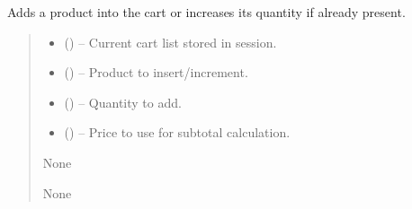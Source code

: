 \documentclass[a4paper,11pt,spanish]{sphinxmanual}
\begin{document}
\begin{fulllineitems}
\label{\detokenize{api/sale/sale.services:sale.services.add_or_increment_cart_item}}
\pysigstartsignatures
\pysiglinewithargsret
{}
{\sphinxparamcomma {}\sphinxparamcomma {}\sphinxparamcomma {}}
{}
\pysigstopsignatures
\sphinxAtStartPar
Adds a product into the cart or increases its quantity if already present.
\begin{quote}\begin{description}
\begin{itemize}
\item {} 
\sphinxAtStartPar
{} (\sphinxstyleliteralemphasis{\sphinxupquote{{[}}}\sphinxstyleliteralemphasis{\sphinxupquote{{]}}}) – Current cart list stored in session.

\item {} 
\sphinxAtStartPar
{} () – Product to insert/increment.

\item {} 
\sphinxAtStartPar
{} () – Quantity to add.

\item {} 
\sphinxAtStartPar
{} () – Price to use for subtotal calculation.

\end{itemize}

\sphinxAtStartPar
None

\sphinxAtStartPar
None

\end{description}\end{quote}

\end{fulllineitems}

\end{document}
